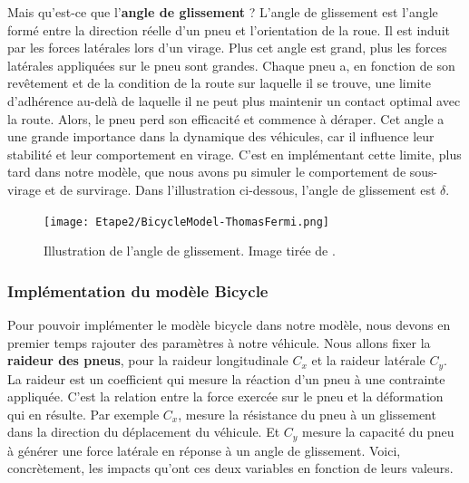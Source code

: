 Mais qu'est-ce que l'\textbf{angle de glissement} ? L'angle de glissement est l'angle formé entre la direction réelle d'un pneu et l'orientation de la roue. Il est induit par les forces latérales lors d'un virage. Plus cet angle est grand, plus les forces latérales appliquées sur le pneu sont grandes. Chaque pneu a, en fonction de son revêtement et de la condition de la route sur laquelle il se trouve, une limite d'adhérence au-delà de laquelle il ne peut plus maintenir un contact optimal avec la route. Alors, le pneu perd son efficacité et commence à déraper. Cet angle a une grande importance dans la dynamique des véhicules, car il influence leur stabilité et
leur comportement en virage.
C'est en implémentant cette limite, plus tard dans notre modèle, que nous avons pu simuler le comportement de sous-virage et de survirage.
Dans l'illustration ci-dessous, l'angle de glissement est $\delta$.
\begin{figure}[h]
    \centering
    \texttt{[image: Etape2/BicycleModel-ThomasFermi.png]}
    \caption{Illustration de l'angle de glissement. Image tirée de \cite{fermi2023}.}
    \label{fig:bicycle_model}
\end{figure}

\subsubsection{Implémentation du modèle Bicycle}
Pour pouvoir implémenter le modèle bicycle dans notre modèle, nous devons en premier temps rajouter des paramètres à notre véhicule. Nous allons fixer la \textbf{raideur des pneus}, pour la raideur longitudinale $C_x$ et la raideur latérale $C_y$. La raideur est un coefficient qui mesure la réaction d'un pneu à une contrainte appliquée. C'est la relation entre la force exercée sur le pneu et la déformation qui en résulte. Par exemple $C_x$, mesure la résistance du pneu à un glissement dans la direction du déplacement du véhicule. Et $C_y$ mesure la capacité du pneu à générer une force latérale en réponse à un angle de glissement. Voici, concrètement, les impacts qu'ont ces deux variables en fonction de leurs valeurs.

